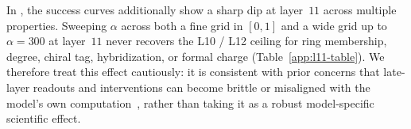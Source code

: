 In \smi, the success curves additionally show a sharp dip at layer~$11$ across multiple properties. Sweeping $\alpha$ across both a fine grid in $[0, 1]$ and a wide grid up to $\alpha = 300$ at layer~$11$ never recovers the L10 / L12 ceiling for ring membership, degree, chiral tag, hybridization, or formal charge (Table~\ref{app:l11-table}). We therefore treat this effect cautiously: it is consistent with prior concerns that late-layer readouts and interventions can become brittle or misaligned with the model's own computation~\citep{park2024linear,belrose2023eliciting,heimersheim2024how}, rather than taking it as a robust model-specific scientific effect.
